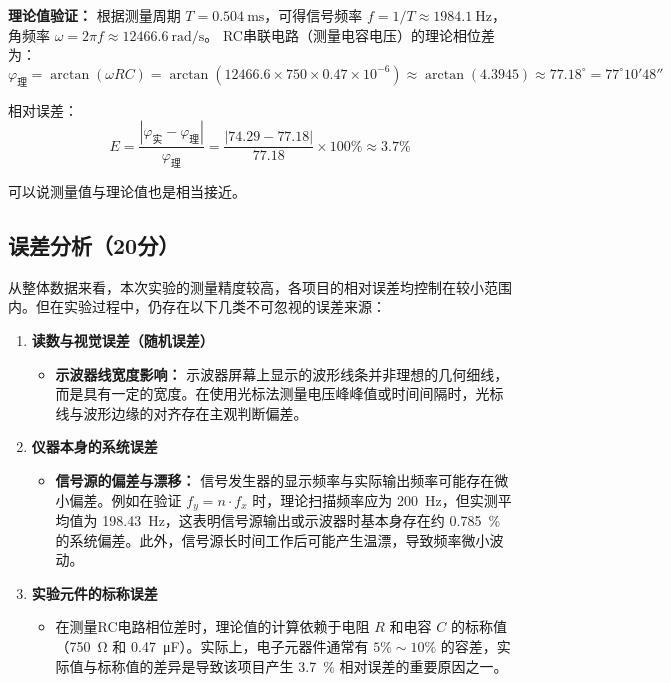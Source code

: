 \documentclass[]{../template/Report}%
\begin{document}
\textbf{理论值验证：}
根据测量周期 $T = \SI{0.504}{\ms}$，可得信号频率 $f = 1/T \approx \SI{1984.1}{\hertz}$，角频率 $\omega = 2\pi f \approx \SI{12466.6}{\radian\per\second}$。
RC串联电路（测量电容电压）的理论相位差为：
\[ \varphi_{\text{理}} = \arctan(\omega RC) = \arctan(12466.6 \times 750 \times 0.47 \times 10^{-6}) \approx \arctan(4.3945) \approx 77.18^\circ = 77^\circ 10' 48'' \]

相对误差：
\[ E = \frac{|\varphi_{\text{实}} - \varphi_{\text{理}}|}{\varphi_{\text{理}}} = \frac{|74.29 - 77.18|}{77.18} \times 100\% \approx 3.7\% \]

可以说测量值与理论值也是相当接近。
\subsection{误差分析（20分）}
从整体数据来看，本次实验的测量精度较高，各项目的相对误差均控制在较小范围内。但在实验过程中，仍存在以下几类不可忽视的误差来源：

\begin{enumerate}
    \item \textbf{读数与视觉误差（随机误差）}
    \begin{itemize}
        \item \textbf{示波器线宽度影响：} 示波器屏幕上显示的波形线条并非理想的几何细线，而是具有一定的宽度。在使用光标法测量电压峰峰值或时间间隔时，光标线与波形边缘的对齐存在主观判断偏差。
    \end{itemize}

    \item \textbf{仪器本身的系统误差}
    \begin{itemize}
        \item \textbf{信号源的偏差与漂移：} 信号发生器的显示频率与实际输出频率可能存在微小偏差。例如在验证 $f_y = n \cdot f_x$ 时，理论扫描频率应为 \SI{200}{\hertz}，但实测平均值为 \SI{198.43}{\hertz}，这表明信号源输出或示波器时基本身存在约 \SI{0.785}{\percent} 的系统偏差。此外，信号源长时间工作后可能产生温漂，导致频率微小波动。
    \end{itemize}

    \item \textbf{实验元件的标称误差}
    \begin{itemize}
        \item 在测量RC电路相位差时，理论值的计算依赖于电阻 $R$ 和电容 $C$ 的标称值（\SI{750}{\ohm} 和 \SI{0.47}{\micro\farad}）。实际上，电子元器件通常有 $5\% \sim 10\%$ 的容差，实际值与标称值的差异是导致该项目产生 \SI{3.7}{\percent} 相对误差的重要原因之一。
    \end{itemize}
\end{enumerate}
\end{document}
